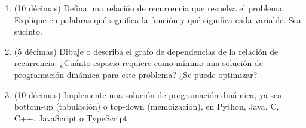
\begin{enumerate}
  \item (10 décimas) Defina una relación de recurrencia que resuelva el problema. Explique en palabras qué significa la función y qué significa cada variable. Sea sucinto.
  \item (5 décimas) Dibuje o describa el grafo de dependencias de la relación de recurrencia. ¿Cuánto espacio requiere como mínimo una solución de programación dinámica para este problema? ¿Se puede optimizar?
  \item (10 décimas) Implemente una solución de programación dinámica, ya sea bottom-up (tabulación) o top-down (memoización), en Python, Java, C, C++, JavaScript o TypeScript.
\end{enumerate}

\bigskip
